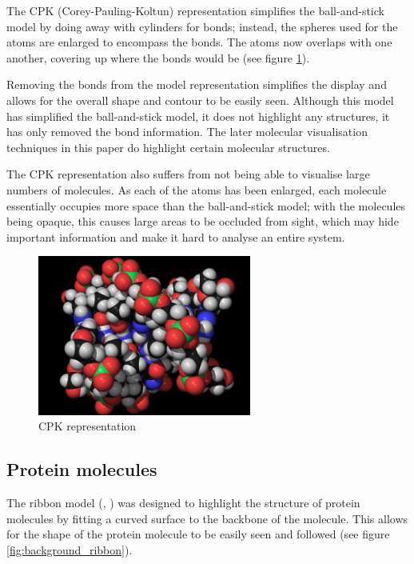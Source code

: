 The CPK (Corey-Pauling-Koltun) \citep{corey53} representation simplifies the
ball-and-stick model by doing away with cylinders for bonds; instead, the
spheres used for the atoms are enlarged to encompass the bonds. The atoms now
overlaps with one another, covering up where the bonds would be (see figure
\ref{fig:background_cpk}).

Removing the bonds from the model representation simplifies the display and
allows for the overall shape and contour to be easily seen. Although this model
has simplified the ball-and-stick model, it does not highlight any structures,
it has only removed the bond information. The later molecular visualisation
techniques in this paper do highlight certain molecular structures.

The CPK representation also suffers from not being able to visualise large
numbers of molecules. As each of the atoms has been enlarged, each molecule
essentially occupies more space than the ball-and-stick model; with the
molecules being opaque, this causes large areas to be occluded from sight, which
may hide important information and make it hard to analyse an entire system.

\begin{figure}[h!]
  \begin{center}
    \includegraphics[width=70mm]{CPK-big}
  \end{center}
  \caption{CPK representation}
  \label{fig:background_cpk}
\end{figure}


\subsection{Protein molecules}
\label{sub:background_protein}

The ribbon model (\citep{richardson81}, \citep{carson87}) was designed to
highlight the structure of protein molecules by fitting a curved surface to the
backbone of the molecule. This allows for the shape of the protein molecule to
be easily seen and followed (see figure \ref{fig:background_ribbon}).

